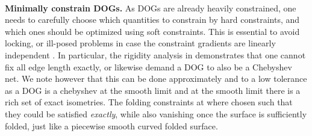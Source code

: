 \\
\textbf{Minimally constrain DOGs.} As DOGs are already heavily constrained, one needs to carefully choose which quantities to constrain by hard constraints, and which ones should be optimized using soft constraints. This is essential to avoid locking, or ill-posed problems in case the constraint gradients are linearly independent \cite{rabi2018shape}. In particular, the rigidity analysis in \cite{rabi18} demonstrates that one cannot fix all edge length exactly, or likewise demand a DOG to also be a Chebyshev net. We note however that this can be done approximately and to a low tolerance as a DOG is a chebyshev at the smooth limit and at the smooth limit there is a rich set of exact isometries. The folding constraints at  where chosen such that they could be satisfied \textit{exactly}, while also vanishing once the surface is sufficiently folded, just like a piecewise smooth curved folded surface. \\

